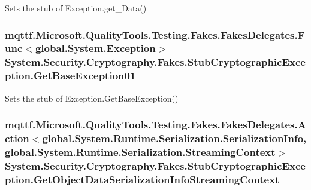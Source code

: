 Sets the stub of Exception.\-get\-\_\-\-Data()

\hypertarget{class_system_1_1_security_1_1_cryptography_1_1_fakes_1_1_stub_cryptographic_exception_a4d20626ebf75ecd76abac56d30fbc526}{
\subsubsection[{Get\-Base\-Exception01}]{\setlength{\rightskip}{0pt plus 5cm}mqttf.\-Microsoft.\-Quality\-Tools.\-Testing.\-Fakes.\-Fakes\-Delegates.\-Func$<$global.\-System.\-Exception$>$ System.\-Security.\-Cryptography.\-Fakes.\-Stub\-Cryptographic\-Exception.\-Get\-Base\-Exception01}}\label{class_system_1_1_security_1_1_cryptography_1_1_fakes_1_1_stub_cryptographic_exception_a4d20626ebf75ecd76abac56d30fbc526}


Sets the stub of Exception.\-Get\-Base\-Exception()

\hypertarget{class_system_1_1_security_1_1_cryptography_1_1_fakes_1_1_stub_cryptographic_exception_a5ffd6c846b103278cd77ea4cf6abbf52}{
\subsubsection[{Get\-Object\-Data\-Serialization\-Info\-Streaming\-Context}]{\setlength{\rightskip}{0pt plus 5cm}mqttf.\-Microsoft.\-Quality\-Tools.\-Testing.\-Fakes.\-Fakes\-Delegates.\-Action$<$global.\-System.\-Runtime.\-Serialization.\-Serialization\-Info, global.\-System.\-Runtime.\-Serialization.\-Streaming\-Context$>$ System.\-Security.\-Cryptography.\-Fakes.\-Stub\-Cryptographic\-Exception.\-Get\-Object\-Data\-Serialization\-Info\-Streaming\-Context}}\label{class_system_1_1_security_1_1_cryptography_1_1_fakes_1_1_stub_cryptographic_exception_a5ffd6c846b103278cd77ea4cf6abbf52}


